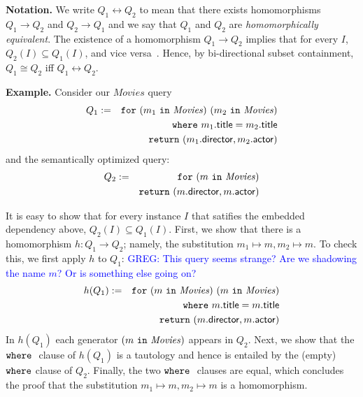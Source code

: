 \documentclass[preprint]{sigplanconf}
\newcommand{\FOR}{{\tt for} \ }
\newcommand{\WHERE}{{\tt where} \ }
\newcommand{\IN}{ \ {\tt in} \ }
\newcommand{\RETURN}{{\tt return} \ }
\newcommand{\greg}[1]{\textcolor{blue}{GREG: #1}}
\newcommand{\relation}[1]{\ensuremath{\mathit{#1}}\xspace}
\begin{document}
{\bf Notation.} We write $Q_1 \leftrightarrow Q_2$ to mean that there exists homomorphisms $Q_1 \to Q_2$ and $Q_2 \to Q_1$ and we say that $Q_1$ and $Q_2$ are {\it homomorphically equivalent}.  The existence of a homomorphism $Q_1 \to Q_2$ implies that for every $I$, $Q_2(I) \subseteq Q_1(I)$, and vice versa~\cite{foundations}.  Hence, by bi-directional subset containment, $Q_1 \cong Q_2$ iff $Q_1 \leftrightarrow Q_2$.

{\bf Example.} Consider our \relation{Movies} query 
\begin{eqnarray*}
Q_1 & := & \FOR (m_1 \IN \relation{Movies}) \ (m_2 \IN \relation{Movies}) \\
 & & \WHERE m_1.{\sf title} = m_2.{\sf title} \\
 & & \RETURN (m_1.{\sf director}, m_2.{\sf actor})
\end{eqnarray*}   
and the semantically optimized query:
\begin{eqnarray*}
Q_2 & := & \FOR (m \IN \relation{Movies}) \\
 & & \RETURN (m.{\sf director}, m.{\sf actor})
\end{eqnarray*}   


It is easy to show that for every instance $I$ that satifies the embedded dependency above, $Q_2(I) \subseteq Q_1(I)$.
First, we show that there is a homomorphism $h : Q_1 \to Q_2$; namely, the substitution $m_1 \mapsto m, m_2 \mapsto m$.
To check this, we first apply $h$ to $Q_1$:
\greg{This query seems strange? Are we shadowing the name $m$? Or is something else going on?}
\begin{eqnarray*}
h(Q_1) & := & \FOR (m \IN \relation{Movies}) \ (m \IN \relation{Movies}) \\
 & & \WHERE m.{\sf title} = m.{\sf title} \\
 & & \RETURN (m.{\sf director}, m.{\sf actor})
\end{eqnarray*}   
In $h(Q_1)$ each generator $(m \IN \relation{Movies})$ appears in $Q_2$.
Next, we show that the $\WHERE$ clause of $h(Q_1)$ is a tautology and hence is entailed by the (empty) ${\tt where}$ clause of $Q_2$.
Finally, the two $\WHERE$ clauses are equal, which concludes the proof that the substitution $m_1 \mapsto m, m_2 \mapsto m$ is a homomorphism.
\end{document}
